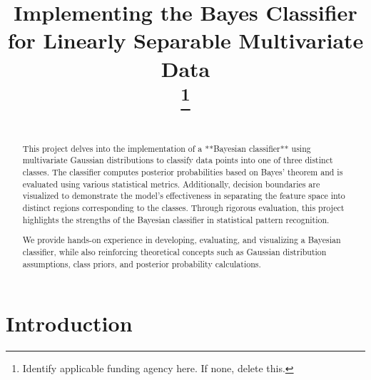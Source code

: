 \documentclass[conference]{IEEEtran}
\begin{document}
	\title{Implementing the Bayes Classifier for Linearly Separable Multivariate Data\\
		\thanks{Identify applicable funding agency here. If none, delete this.}
	}
	
	\author{
		\and
		\and
	}
	
	\maketitle
	
	\begin{abstract}
		\\
		This project delves into the implementation of a **Bayesian classifier** using multivariate Gaussian distributions to classify data points into one of three distinct classes. The classifier computes posterior probabilities based on Bayes' theorem and is evaluated using various statistical metrics. Additionally, decision boundaries are visualized to demonstrate the model's effectiveness in separating the feature space into distinct regions corresponding to the classes. Through rigorous evaluation, this project highlights the strengths of the Bayesian classifier in statistical pattern recognition.
		
		We provide hands-on experience in developing, evaluating, and visualizing a Bayesian classifier, while also reinforcing theoretical concepts such as Gaussian distribution assumptions, class priors, and posterior probability calculations.
	\end{abstract}
	
	\section{Introduction}
	
\end{document}
